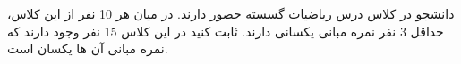  دانشجو در کلاس درس ریاضیات گسسته حضور دارند. در میان هر 10 نفر از این کلاس، حداقل 3 نفر نمره مبانی یکسانی دارند. ثابت کنید در این کلاس 15 نفر وجود دارند که نمره مبانی آن ها یکسان است.